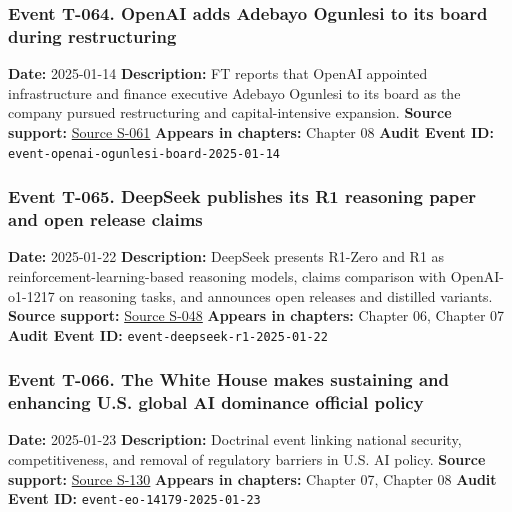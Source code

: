 \documentclass[
  american,
  11pt,
  letterpaper,
]{article}
\begin{document}
\subsubsection{Event T-064. OpenAI adds Adebayo Ogunlesi to its board
during
restructuring}\label{event-t-064-openai-adds-adebayo-ogunlesi-to-its-board-during-restructuring}

\textbf{Date:} 2025-01-14 \textbf{Description:} FT reports that OpenAI
appointed infrastructure and finance executive Adebayo Ogunlesi to its
board as the company pursued restructuring and capital-intensive
expansion. \textbf{Source support:}
\hyperref[source-s-061-openai-appoints-one-of-wall-street-s-most-powerful-dealmakers-to-its-board]{Source
S-061} \textbf{Appears in chapters:} Chapter 08 \textbf{Audit Event ID:}
\texttt{event-openai-ogunlesi-board-2025-01-14}

\subsubsection{Event T-065. DeepSeek publishes its R1 reasoning paper
and open release
claims}\label{event-t-065-deepseek-publishes-its-r1-reasoning-paper-and-open-release-claims}

\textbf{Date:} 2025-01-22 \textbf{Description:} DeepSeek presents
R1-Zero and R1 as reinforcement-learning-based reasoning models, claims
comparison with OpenAI-o1-1217 on reasoning tasks, and announces open
releases and distilled variants. \textbf{Source support:}
\hyperref[source-s-048-deepseek-r1-incentivizing-reasoning-capability-in-llms-via-reinforcement-learning]{Source
S-048} \textbf{Appears in chapters:} Chapter 06, Chapter 07
\textbf{Audit Event ID:} \texttt{event-deepseek-r1-2025-01-22}

\subsubsection{Event T-066. The White House makes sustaining and
enhancing U.S. global AI dominance official
policy}\label{event-t-066-the-white-house-makes-sustaining-and-enhancing-u-s-global-ai-dominance-official-policy}

\textbf{Date:} 2025-01-23 \textbf{Description:} Doctrinal event linking
national security, competitiveness, and removal of regulatory barriers
in U.S. AI policy. \textbf{Source support:}
\hyperref[source-s-130-removing-barriers-to-american-leadership-in-artificial-intelligence]{Source
S-130} \textbf{Appears in chapters:} Chapter 07, Chapter 08
\textbf{Audit Event ID:} \texttt{event-eo-14179-2025-01-23}
\end{document}
